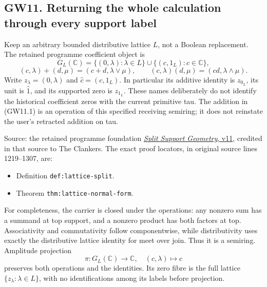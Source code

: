 \subsection{GW11. Returning the whole calculation through every support
label}\label{gw20260924-gw11.-returning-the-whole-calculation-through-every-support-label}

Keep an arbitrary bounded distributive lattice \(L\), not a Boolean
replacement. The retained programme coefficient object is \[
G_L(\mathbb C)=\{(0,\lambda):\lambda\in L\}
\cup\{(c,1_L):c\in\mathbb C\},
\] \[
(c,\lambda)+(d,\mu)=(c+d,\lambda\vee\mu),\qquad
(c,\lambda)(d,\mu)=(cd,\lambda\wedge\mu).
\tag{GW11.1}
\] Write \(z_\lambda=(0,\lambda)\) and \(\widehat c=(c,1_L)\). In
particular its additive identity is \(z_{0_L}\), its unit is
\(\widehat1\), and its supported zero is \(z_{1_L}\). These names
deliberately do not identify the historical coefficient zeros with the
current primitive tau. The addition in (GW11.1) is an operation of this
specified receiving semiring; it does not reinstate the user's retracted
addition on tau.

Source: the retained programme foundation
\href{https://github.com/KokunoYumeto/zeta-function-research-reader/blob/a2851f9eb352e7e4376bc629de86fa4ed9c1c434/workbenches/splitzero-tandem/foundations/split-support-geometry-v11/split_support_geometry_arithmetic_curve_v11.tex}{\emph{Split
Support Geometry}, v11}, credited in that source to The Clankers. The
exact proof locators, in original source lines 1219--1307, are:

\begin{itemize}

\item
  Definition \texttt{def:lattice-split}.
\item
  Theorem \texttt{thm:lattice-normal-form}.
\end{itemize}

For completeness, the carrier is closed under the operations: any
nonzero sum has a summand at top support, and a nonzero product has both
factors at top. Associativity and commutativity follow componentwise,
while distributivity uses exactly the distributive lattice identity for
meet over join. Thus it is a semiring. Amplitude projection \[
\pi:G_L(\mathbb C)\longrightarrow\mathbb C,\quad(c,\lambda)\mapsto c
\tag{GW11.2}
\] preserves both operations and the identities. Its zero fibre is the
full lattice \(\{z_\lambda:\lambda\in L\}\), with no identifications
among its labels before projection.

